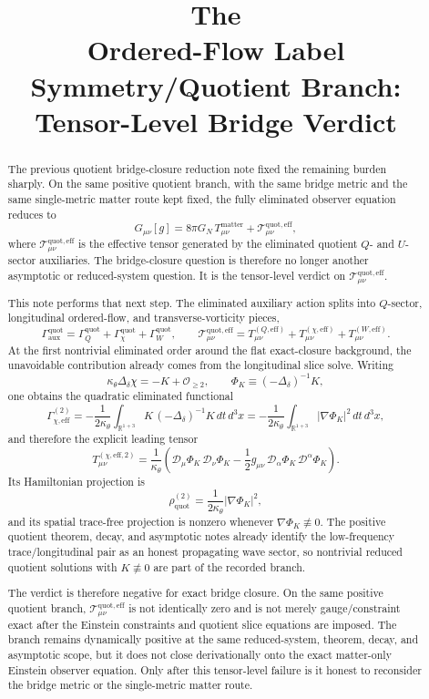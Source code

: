 \documentclass[11pt]{article}
\title{\textbf{The \TheoryName{}}\\[0.4em]
\large Ordered-Flow Label Symmetry/Quotient Branch: Tensor-Level Bridge Verdict}
\author{}
\date{}
\newcommand{\EffAux}{\mathcal T_{\mu\nu}^{\mathrm{quot,eff}}}
\newcommand{\Dperp}{\mathcal D}
\begin{document}
\maketitle

\begin{abstract}
The previous quotient bridge-closure reduction note fixed the remaining burden sharply. On the same positive quotient branch, with the same bridge metric and the same single-metric matter route kept fixed, the fully eliminated observer equation reduces to
\[
G_{\mu\nu}[g]
=
8\pi G_N\,T_{\mu\nu}^{\mathrm{matter}}
+ \EffAux,
\]
where \(\EffAux\) is the effective tensor generated by the eliminated quotient \(Q\)- and \(U\)-sector auxiliaries. The bridge-closure question is therefore no longer another asymptotic or reduced-system question. It is the tensor-level verdict on \(\EffAux\).

This note performs that next step. The eliminated auxiliary action splits into \(Q\)-sector, longitudinal ordered-flow, and transverse-vorticity pieces,
\[
\Gamma_{\mathrm{aux}}^{\mathrm{quot}}
=
\Gamma_Q^{\mathrm{quot}}
+\Gamma_\chi^{\mathrm{quot}}
+\Gamma_W^{\mathrm{quot}},
\qquad
\EffAux
=
T_{\mu\nu}^{(Q,\mathrm{eff})}
+T_{\mu\nu}^{(\chi,\mathrm{eff})}
+T_{\mu\nu}^{(W,\mathrm{eff})}.
\]
At the first nontrivial eliminated order around the flat exact-closure background, the unavoidable contribution already comes from the longitudinal slice solve. Writing
\[
\kappa_\theta\Delta_\delta\chi=-K+\mathcal O_{\ge 2},
\qquad
\Phi_K\equiv(-\Delta_\delta)^{-1}K,
\]
one obtains the quadratic eliminated functional
\[
\Gamma_{\chi,\mathrm{eff}}^{(2)}
=
-\frac{1}{2\kappa_\theta}
\int_{\mathbb R^{1+3}} K\,(-\Delta_\delta)^{-1}K\,dt\,d^3x
=
-\frac{1}{2\kappa_\theta}
\int_{\mathbb R^{1+3}}
|\nabla\Phi_K|^2\,dt\,d^3x,
\]
and therefore the explicit leading tensor
\[
T_{\mu\nu}^{(\chi,\mathrm{eff},2)}
=
\frac{1}{\kappa_\theta}
\left(
\Dperp_\mu\Phi_K\,\Dperp_\nu\Phi_K
-\frac12 g_{\mu\nu}\,\Dperp_\alpha\Phi_K\,\Dperp^\alpha\Phi_K
\right).
\]
Its Hamiltonian projection is
\[
\rho_{\mathrm{quot}}^{(2)}
=
\frac{1}{2\kappa_\theta}|\nabla\Phi_K|^2,
\]
and its spatial trace-free projection is nonzero whenever \(\nabla\Phi_K\not\equiv0\). The positive quotient theorem, decay, and asymptotic notes already identify the low-frequency trace/longitudinal pair as an honest propagating wave sector, so nontrivial reduced quotient solutions with \(K\not\equiv0\) are part of the recorded branch.

The verdict is therefore negative for exact bridge closure. On the same positive quotient branch, \(\EffAux\) is not identically zero and is not merely gauge/constraint exact after the Einstein constraints and quotient slice equations are imposed. The branch remains dynamically positive at the same reduced-system, theorem, decay, and asymptotic scope, but it does not close derivationally onto the exact matter-only Einstein observer equation. Only after this tensor-level failure is it honest to reconsider the bridge metric or the single-metric matter route.
\end{abstract}
\end{document}
